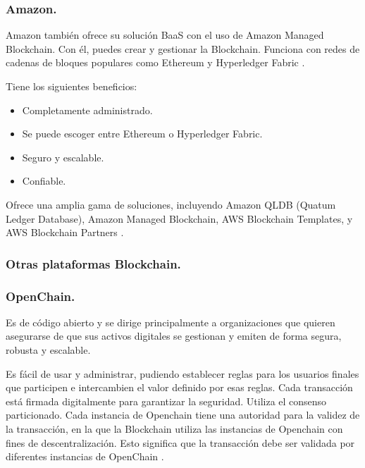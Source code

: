 \subsubsection*{Amazon.}

Amazon también ofrece su solución BaaS con el uso de Amazon Managed Blockchain. Con él, puedes crear y gestionar la 
Blockchain. Funciona con redes de cadenas de bloques populares como Ethereum y Hyperledger Fabric 
\cite{top-blockchain-platforms}.

\vspace{5mm}

\noindent Tiene los siguientes beneficios:

\begin{itemize}
    \item Completamente administrado.
    \item Se puede escoger entre Ethereum o Hyperledger Fabric.
    \item Seguro y escalable.
    \item Confiable.
\end{itemize}

\noindent Ofrece una amplia gama de soluciones, incluyendo Amazon QLDB (Quatum Ledger Database), Amazon Managed 
Blockchain, AWS Blockchain Templates, y AWS Blockchain Partners \cite{top-blockchain-platforms}.

\subsubsection{Otras plataformas Blockchain.}

\subsubsection*{OpenChain.}

Es de código abierto y se dirige principalmente a organizaciones que quieren asegurarse de que sus activos digitales
se gestionan y emiten de forma segura, robusta y escalable.

\vspace{5mm}

\noindent Es fácil de usar y administrar, pudiendo establecer reglas para los usuarios finales que participen e 
intercambien el valor definido por esas reglas. Cada transacción está firmada digitalmente para garantizar la 
seguridad. Utiliza el consenso particionado. Cada instancia de Openchain tiene una autoridad para la validez de 
la transacción, en la que la Blockchain utiliza las instancias de Openchain con fines de descentralización. Esto 
significa que la transacción debe ser validada por diferentes instancias de OpenChain \cite{top-blockchain-platforms}.

